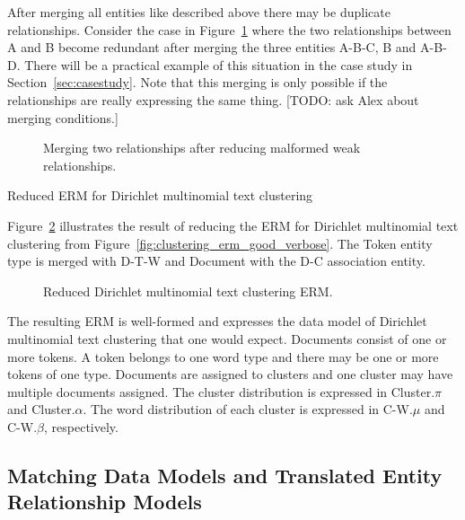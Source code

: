 After merging all entities like described above there may be duplicate relationships. Consider the case in Figure~\ref{fig:erm_reduction_minimal_example} where the two relationships between A and B become redundant after merging the three entities A-B-C, B and A-B-D. There will be a practical example of this situation in the case study in Section~\ref{sec:casestudy}. Note that this merging is only possible if the relationships are really expressing the same thing. {\footnotesize[TODO: ask Alex about merging conditions.]}

\begin{figure}[t]
\centering
\scalebox{\tikzScale}{\adjustTikzSize }
\caption{Merging two relationships after reducing malformed weak relationships.}\label{fig:erm_reduction_minimal_example}
\end{figure}

\begin{Example}{Reduced ERM for Dirichlet multinomial text clustering}

Figure~\ref{fig:clustering_erm_good_reduced} illustrates the result of reducing the ERM for Dirichlet multinomial text clustering from Figure~\ref{fig:clustering_erm_good_verbose}. The Token entity type is merged with D-T-W and Document with the D-C association entity.

\begin{figure}[h]
\centering
\scalebox{\tikzScale}{\adjustTikzSize }
\caption{Reduced Dirichlet multinomial text clustering ERM.}\label{fig:clustering_erm_good_reduced}
\end{figure}

The resulting ERM is well-formed and expresses the data model of Dirichlet multinomial text clustering that one would expect. Documents consist of one or more tokens. A token belongs to one word type and there may be one or more tokens of one type. Documents are assigned to clusters and one cluster may have multiple documents assigned. The cluster distribution is expressed in Cluster.$\pi$ and Cluster.$\alpha$. The word distribution of each cluster is expressed in C-W.$\mu$ and C-W.$\beta$, respectively.

\end{Example}

\subsection{Matching Data Models and Translated Entity Relationship Models}

